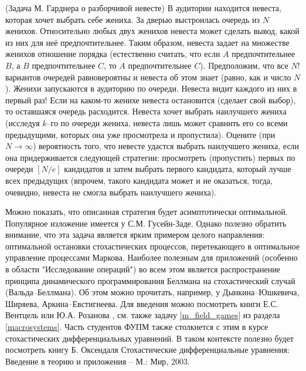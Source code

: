  \begin{problem}(Задача М. Гарднера о разборчивой невесте)
 В аудитории находится невеста, которая хочет выбрать себе жениха. За дверью выстроилась очередь из $N$ женихов. Относительно любых 
 двух женихов невеста может сделать вывод, какой из них для неё предпочтительнее. Таким образом, невеста задает на множестве женихов 
 отношение порядка (естественно считать, что если $A$ предпочтительнее $B$, а $B$ предпочтительнее $C$, то $A$ предпочтительнее $C$). 
 Предположим, что все $N!$ вариантов очередей равновероятны и невеста об этом знает (равно, как и число $N$). Женихи запускаются 
 в аудиторию по очереди. Невеста видит каждого из них в первый раз! Если на каком-то женихе невеста остановится (сделает свой выбор), 
 то оставшаяся очередь расходится. Невеста хочет выбрать наилучшего жениха (исследуя $k$–го по очереди жениха, невеста лишь может 
 сравнить его со всеми предыдущими, которых она уже просмотрела и пропустила). Оцените (при $N\to\infty$) вероятность того, что невесте 
 удастся выбрать наилучшего жениха, если она придерживается следующей стратегии: просмотреть (пропустить) первых по очереди $[N/e]$ 
 кандидатов и затем выбрать первого кандидата, который лучше всех предыдущих (впрочем, такого кандидата может и не оказаться, тогда, 
 очевидно, невеста не смогла выбрать наилучшего жениха). 
 \end{problem}
 \begin{remark}
 Можно показать, что описанная стратегия будет асимптотически оптимальной. Популярное изложение имеется у С.М. Гусейн-Заде. Однако полезно обратить внимание, что эта задача является ярким примером целого направления: оптимальной остановки стохастических процессов, перетекающего в оптимальное управление процессами Маркова. Наиболее полезным для приложений (особенно в области "Исследование операций") во всем этом является распространение принципа динамического программирования Беллмана на стохастический случай ({ Вальда--Беллмана}). Об этом можно прочитать, например, у Дынкина--Юшкевича, Ширяева, Аркина--Евстигнеева. Для введения можно посмотреть книги Е.С. Вентцель или Ю.А. Розанова \cite{6}, см. также задачу \ref{m_field_games} из раздела \ref{macrosystems}. Часть студентов ФУПМ также столкнется с этим в курсе стохастических дифференциальных уравнений. В таком контексте полезно будет посмотреть книгу Б. Оксендаля Стохастические дифференциальные уравнения: Введение в теорию и приложения -- М.: Мир, 2003. 
 \end{remark}
 
